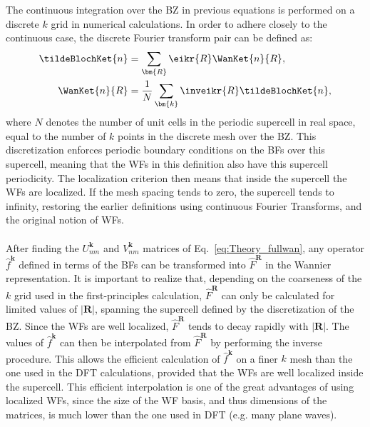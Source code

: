The continuous integration over the BZ in previous equations is performed on a discrete $k$ grid in numerical calculations.
In order to adhere closely to the continuous case, the discrete Fourier transform pair can be defined as:
\begin{align}
	\tildeBlochKet{n} &= \sum_{\bm{R}} \eikr{R} \WanKet{n}{R},\label{eq:Theory_wantok}\\
	\WanKet{n}{R} &= \frac{1}{N}\sum_{\bm{k}} \inveikr{R} \tildeBlochKet{n},
\end{align}
where $N$ denotes the number of unit cells in the periodic supercell in real space, equal to the number of $k$ points in the discrete mesh over the BZ.
This discretization enforces periodic boundary conditions on the BFs over this supercell, meaning that the WFs in this definition also have this supercell periodicity.
The localization criterion then means that inside the supercell the WFs are localized.
If the mesh spacing tends to zero, the supercell tends to infinity, restoring the earlier definitions using continuous Fourier Transforms, and the original notion of WFs.
\\\\
After finding the $U^{\bm{k}}_{nm}$ and $V^{\bm{k}}_{nm}$ matrices of Eq.~\eqref{eq:Theory_fullwan}, any operator $\hat{f}^{\bm{k}}$ defined in terms of the BFs can be transformed into $\hat{F}^{\bm{R}}$ in the Wannier representation.
It is important to realize that, depending on the coarseness of the $k$ grid used in the first-principles calculation, $\hat{F}^{\bm{R}}$ can only be calculated for limited values of $|\bm{R}|$, spanning the supercell defined by the discretization of the BZ.
Since the WFs are well localized, $\hat{F}^{\bm{R}}$ tends to decay rapidly with $|\bm{R}|$.
The values of $\hat{f}^{\bm{k}}$ can then be interpolated from $\hat{F}^{\bm{R}}$ by performing the inverse procedure.
This allows the efficient calculation of $\hat{f}^{\bm{k}}$ on a finer $k$ mesh than the one used in the DFT calculations, provided that the WFs are well localized inside the supercell.
This efficient interpolation is one of the great advantages of using localized WFs, since the size of the WF basis, and thus dimensions of the matrices, is much lower than the one used in DFT (e.g. many plane waves).

